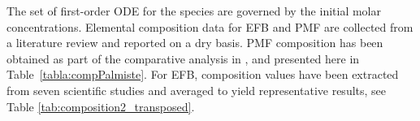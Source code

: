 \documentclass[preprint,12pt]{elsarticle}
\begin{document}

The set of first-order ODE for the species are governed by the initial molar concentrations. Elemental composition data for EFB and PMF are collected from a literature review and reported on a dry basis. PMF composition has been obtained as part of the comparative analysis in \cite{Idris2012}, and presented here in Table~\ref{tabla:compPalmiste}. For EFB, composition values have been extracted from seven scientific studies and averaged to yield representative results, see Table \ref{tab:composition2_transposed}.\\ 
\end{document}
